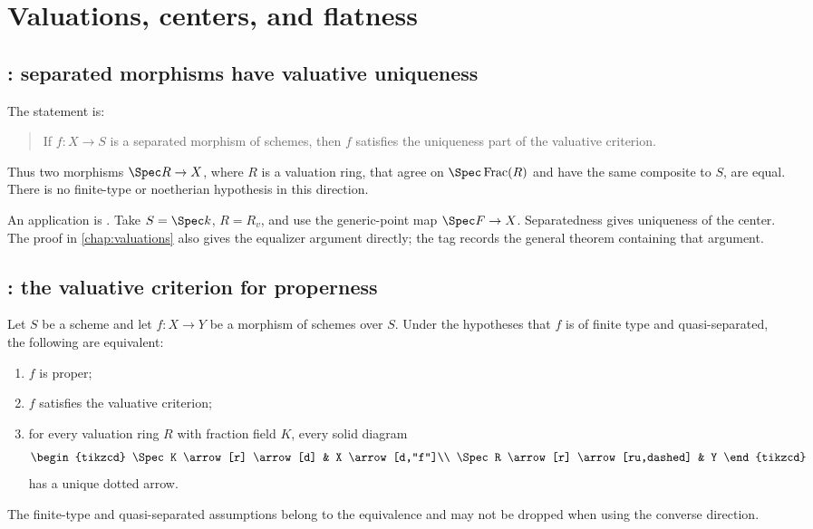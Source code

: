 \section{Valuations, centers, and flatness}
\label{sec:stacks-valuations}

\subsection*{: separated morphisms have valuative uniqueness}
\label{sec:stacks-tag-01KZ}

The statement is:
\begin{quote}
If \(f:X\to S\) is a separated morphism of schemes, then \(f\) satisfies the
uniqueness part of the valuative criterion.
\end{quote}
Thus two morphisms \(\Spec R\to X\), where \(R\) is a valuation ring, that
agree on \(\Spec\operatorname{Frac}(R)\) and have the same composite to
\(S\), are equal.
There is no finite-type or noetherian hypothesis in this direction.

An application is .
Take \(S=\Spec k\), \(R=R_v\), and use the generic-point map
\(\Spec F\to X\). Separatedness gives uniqueness of the center. The proof
in \cref{chap:valuations} also gives the equalizer argument directly; the tag records the
general theorem containing that argument.

\subsection*{: the valuative criterion for properness}
\label{sec:stacks-tag-0BX5}

Let \(S\) be a scheme and let \(f:X\to Y\) be a morphism of schemes over
\(S\). Under the hypotheses that \(f\) is of finite type and
quasi-separated, the following are equivalent:
\begin{enumerate}
\item \(f\) is proper;
\item \(f\) satisfies the valuative criterion;
\item for every valuation ring \(R\) with fraction field \(K\), every solid
diagram
\[
\begin{tikzcd}
\Spec K \arrow[r] \arrow[d] & X \arrow[d,"f"]\\
\Spec R \arrow[r] \arrow[ru,dashed] & Y
\end{tikzcd}
\]
has a unique dotted arrow.
\end{enumerate}
The finite-type and quasi-separated assumptions belong to the equivalence
and may not be dropped when using the converse direction.

